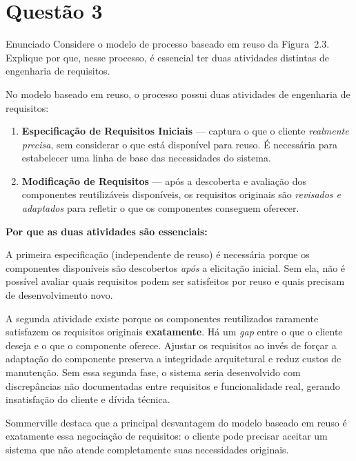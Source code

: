 \documentclass[12pt,a4paper]{article}
\begin{document}
\section*{Questão 3}

\begin{questao}{Enunciado}
Considere o modelo de processo baseado em reuso da Figura~2.3. Explique por
que, nesse processo, é essencial ter duas atividades distintas de engenharia
de requisitos.
\end{questao}

\begin{resposta}

No modelo baseado em reuso, o processo possui duas atividades de engenharia
de requisitos:

\begin{enumerate}
  \item \textbf{Especificação de Requisitos Iniciais} — captura o que o cliente
        \emph{realmente precisa}, sem considerar o que está disponível para reuso.
        É necessária para estabelecer uma linha de base das necessidades do sistema.

  \item \textbf{Modificação de Requisitos} — após a descoberta e avaliação dos
        componentes reutilizáveis disponíveis, os requisitos originais são
        \emph{revisados e adaptados} para refletir o que os componentes
        conseguem oferecer.
\end{enumerate}

\textbf{Por que as duas atividades são essenciais:}

A primeira especificação (independente de reuso) é necessária porque os
componentes disponíveis são descobertos \emph{após} a elicitação inicial. Sem
ela, não é possível avaliar quais requisitos podem ser satisfeitos por reuso e
quais precisam de desenvolvimento novo.

A segunda atividade existe porque os componentes reutilizados raramente satisfazem
os requisitos originais \textbf{exatamente}. Há um \textit{gap} entre o que o
cliente deseja e o que o componente oferece. Ajustar os requisitos ao invés de
forçar a adaptação do componente preserva a integridade arquitetural e reduz
custos de manutenção. Sem essa segunda fase, o sistema seria desenvolvido com
discrepâncias não documentadas entre requisitos e funcionalidade real, gerando
insatisfação do cliente e dívida técnica.

\begin{nota}
Sommerville destaca que a principal desvantagem do modelo baseado em reuso é
exatamente essa negociação de requisitos: o cliente pode precisar aceitar um
sistema que não atende completamente suas necessidades originais.
\end{nota}

\end{resposta}
\end{document}
